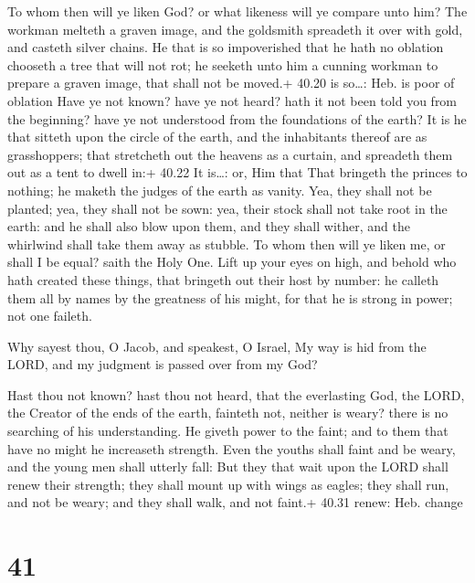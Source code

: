  To whom then will ye liken God? or what likeness will ye
compare unto him?  The workman melteth a graven image, and
the goldsmith spreadeth it over with gold, and casteth silver chains.
 He that is so impoverished that he hath no oblation
chooseth a tree that will not rot; he seeketh unto him a cunning workman
to prepare a graven image, that shall not be moved.+ 40.20 is so\ldots:
Heb. is poor of oblation  Have ye not known? have ye not
heard? hath it not been told you from the beginning? have ye not
understood from the foundations of the earth?  It is he
that sitteth upon the circle of the earth, and the inhabitants thereof
are as grasshoppers; that stretcheth out the heavens as a curtain, and
spreadeth them out as a tent to dwell in:+ 40.22 It is\ldots: or, Him
that  That bringeth the princes to nothing; he maketh the
judges of the earth as vanity.  Yea, they shall not be
planted; yea, they shall not be sown: yea, their stock shall not take
root in the earth: and he shall also blow upon them, and they shall
wither, and the whirlwind shall take them away as stubble. 
To whom then will ye liken me, or shall I be equal? saith the Holy One.
 Lift up your eyes on high, and behold who hath created
these things, that bringeth out their host by number: he calleth them
all by names by the greatness of his might, for that he is strong in
power; not one faileth.

 Why sayest thou, O Jacob, and speakest, O Israel, My way
is hid from the LORD, and my judgment is passed over from my God?

 Hast thou not known? hast thou not heard, that the
everlasting God, the LORD, the Creator of the ends of the earth,
fainteth not, neither is weary? there is no searching of his
understanding.  He giveth power to the faint; and to them
that have no might he increaseth strength.  Even the youths
shall faint and be weary, and the young men shall utterly fall:
 But they that wait upon the LORD shall renew their
strength; they shall mount up with wings as eagles; they shall run, and
not be weary; and they shall walk, and not faint.+ 40.31 renew: Heb.
change

\hypertarget{section-40}{%
\section{41}\label{section-40}}

